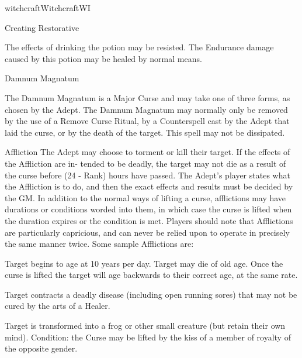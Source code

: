 \begin{College}[1.1]{witchcraft}{Witchcraft}{WI}
\begin{spell}[S-9]{Creating Restorative}
\begin{effects}
The effects of drinking the potion may be resisted.  The Endurance
damage caused by this potion may be healed by normal means.

\end{effects}
\end{spell}

\begin{spell}[S-10]{Damnum Magnatum}

\begin{effects}
The Damnum Magnatum is a Major Curse and may take one of three forms,
as chosen by the Adept.  The Damnum Magnatum may normally only be
removed by the use of a Remove Curse Ritual, by a Counterspell cast by
the Adept that laid the curse, or by the death of the target.  This
spell may not be dissipated.

\begin{Description}
\item[Affliction] The Adept may choose to torment or kill their
  target.  If the effects of the Affliction are in- tended to be
  deadly, the target may not die as a result of the curse before (24 -
  Rank) hours have passed.  The Adept’s player states what the
  Affliction is to do, and then the exact effects and results must be
  decided by the GM.  In addition to the normal ways of lifting a
  curse, afflictions may have durations or conditions worded into
  them, in which case the curse is lifted when the duration expires or
  the condition is met.  Players should note that Afflictions are
  particularly capricious, and can never be relied upon to operate in
  precisely the same manner twice. Some sample Afflictions are:
\begin{Itemize}
\item Target begins to age at 10 years per day. Target may die of old
  age.  Once the curse is lifted the target will age backwards to
  their correct age, at the same rate.

\item Target contracts a deadly disease (including open running sores)
  that may not be cured by the arts of a Healer.

\item Target is transformed into a frog or other small creature (but
  retain their own mind). Condition: the Curse may be lifted by the
  kiss of a member of royalty of the opposite gender.


\end{Itemize}
\end{Description}
\end{effects}
\end{spell}
\end{College}
